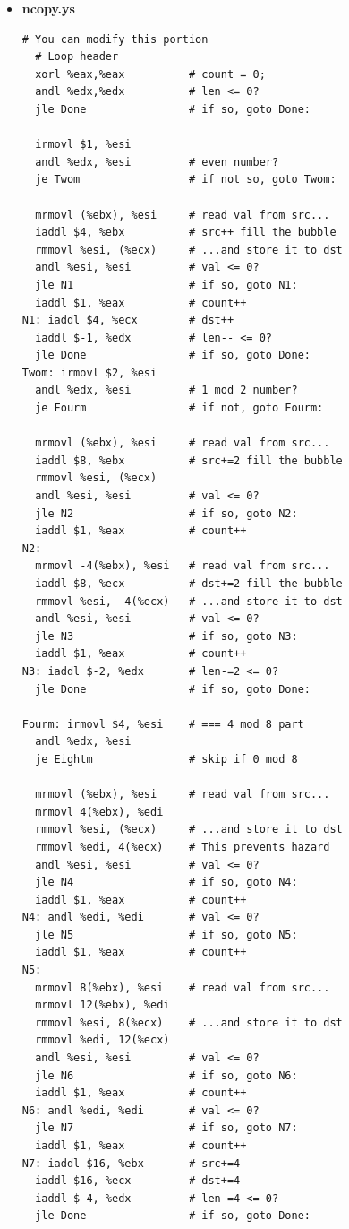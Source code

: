 \documentclass{article}
\begin{document}
\begin{itemize}
	\item \textbf{ncopy.ys}
\begin{lstlisting}
# You can modify this portion
  # Loop header
  xorl %eax,%eax          # count = 0;
  andl %edx,%edx          # len <= 0?
  jle Done                # if so, goto Done:
  
  irmovl $1, %esi
  andl %edx, %esi         # even number?
  je Twom                 # if not so, goto Twom:
  
  mrmovl (%ebx), %esi     # read val from src...
  iaddl $4, %ebx          # src++ fill the bubble
  rmmovl %esi, (%ecx)     # ...and store it to dst
  andl %esi, %esi         # val <= 0?
  jle N1                  # if so, goto N1:
  iaddl $1, %eax          # count++
N1: iaddl $4, %ecx        # dst++
  iaddl $-1, %edx         # len-- <= 0?
  jle Done                # if so, goto Done:
Twom: irmovl $2, %esi 
  andl %edx, %esi         # 1 mod 2 number?
  je Fourm                # if not, goto Fourm:
  
  mrmovl (%ebx), %esi     # read val from src...
  iaddl $8, %ebx          # src+=2 fill the bubble
  rmmovl %esi, (%ecx)
  andl %esi, %esi         # val <= 0?
  jle N2                  # if so, goto N2:
  iaddl $1, %eax          # count++
N2:
  mrmovl -4(%ebx), %esi   # read val from src...
  iaddl $8, %ecx          # dst+=2 fill the bubble
  rmmovl %esi, -4(%ecx)   # ...and store it to dst
  andl %esi, %esi         # val <= 0?
  jle N3                  # if so, goto N3:
  iaddl $1, %eax          # count++
N3: iaddl $-2, %edx       # len-=2 <= 0?
  jle Done                # if so, goto Done:

Fourm: irmovl $4, %esi    # === 4 mod 8 part
  andl %edx, %esi
  je Eightm               # skip if 0 mod 8

  mrmovl (%ebx), %esi     # read val from src...
  mrmovl 4(%ebx), %edi
  rmmovl %esi, (%ecx)     # ...and store it to dst
  rmmovl %edi, 4(%ecx)    # This prevents hazard
  andl %esi, %esi         # val <= 0?       
  jle N4                  # if so, goto N4:
  iaddl $1, %eax          # count++
N4: andl %edi, %edi       # val <= 0?
  jle N5                  # if so, goto N5:
  iaddl $1, %eax          # count++
N5:
  mrmovl 8(%ebx), %esi    # read val from src...
  mrmovl 12(%ebx), %edi
  rmmovl %esi, 8(%ecx)    # ...and store it to dst
  rmmovl %edi, 12(%ecx)  
  andl %esi, %esi         # val <= 0?  
  jle N6                  # if so, goto N6:
  iaddl $1, %eax          # count++
N6: andl %edi, %edi       # val <= 0?  
  jle N7                  # if so, goto N7:
  iaddl $1, %eax          # count++
N7: iaddl $16, %ebx       # src+=4
  iaddl $16, %ecx         # dst+=4
  iaddl $-4, %edx         # len-=4 <= 0?
  jle Done                # if so, goto Done:


\end{lstlisting}
\end{itemize}
\end{document}
